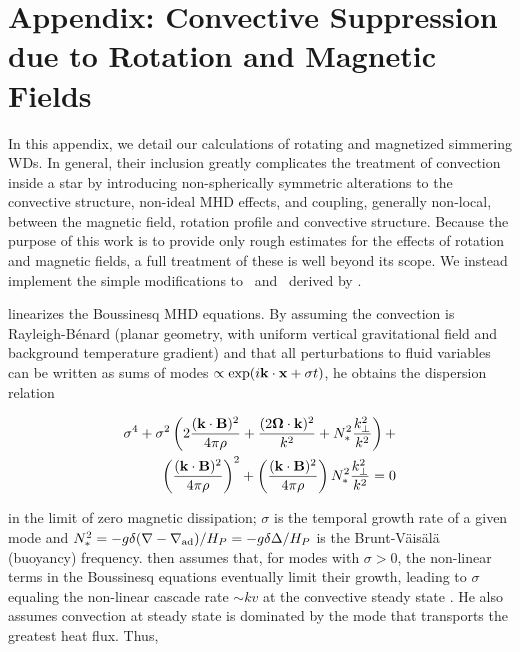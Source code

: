 \section{Appendix: Convective Suppression due to Rotation and Magnetic Fields}
\label{sec:c5_suppression}

In this appendix, we detail our calculations of rotating and magnetized simmering WDs.  In general, their inclusion greatly complicates the treatment of convection inside a star by introducing non-spherically symmetric alterations to the convective structure, non-ideal MHD effects, and coupling, generally non-local, between the magnetic field, rotation profile and convective structure.  Because the purpose of this work is to provide only rough estimates for the effects of rotation and magnetic fields, a full treatment of these is well beyond its scope.  We instead implement the simple modifications to \deltanab\ and \vconv\ derived by \citeal{stev79}.

\citeal{stev79} linearizes the Boussinesq MHD equations.  By assuming the convection is Rayleigh-B\'{e}nard (planar geometry, with uniform vertical gravitational field and background temperature gradient) and that all perturbations to fluid variables can be written as sums of modes $\propto\exp(i{\bf k}\cdot{\bf x} + \sigma t)$, he obtains the dispersion relation

\begin{eqnarray}
\sigma^4 + \sigma^2\left(2\frac{({\bf k}\cdot{\bf B})^2}{4\pi\rho} + \frac{(2\boldsymbol{\Omega}\cdot{\bf k})^2}{k^2} + N_*^2\frac{k_\perp^2}{k^2}\right) + \nonumber \\
\left(\frac{({\bf k}\cdot{\bf B})^2}{4\pi\rho}\right)^2 + \left(\frac{({\bf k}\cdot{\bf B})^2}{4\pi\rho}\right)N_*^2\frac{k_\perp^2}{k^2} = 0
\label{eq:c5_stev79dispersion}
\end{eqnarray}

\noindent in the limit of zero magnetic dissipation; $\sigma$ is the temporal growth rate of a given mode and $N_*^2 = -g\delta(\nabla - \nablaad)/H_P = -g\delta\Delta/H_P$ is the Brunt-V\"{a}is\"{a}l\"{a} (buoyancy) frequency.  \citeal{stev79} then assumes that, for modes with $\sigma > 0$, the non-linear terms in the Boussinesq equations eventually limit their growth, leading to $\sigma$ equaling the non-linear cascade rate $\sim kv$ at the convective steady state \citep{barkdl14}.  He also assumes convection at steady state is dominated by the mode that transports the greatest heat flux.  Thus,


